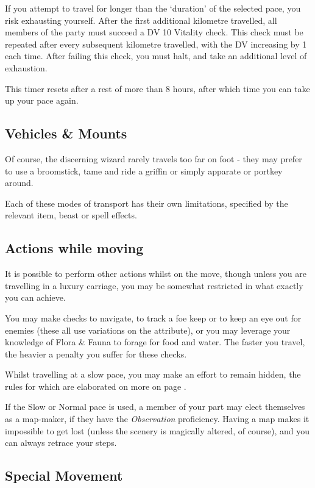 \normalsize
If you attempt to travel for longer than the `duration' of the selected pace, you risk exhausting yourself. After the first additional kilometre travelled, all members of the party must succeed a DV 10 Vitality check. This check must be repeated after every subsequent kilometre travelled, with the DV increasing by 1 each time. After failing this check, you must halt, and take an additional level of exhaustion. 

This timer resets after a rest of more than 8 hours, after which time you can take up your pace again. 

\subsection{Vehicles \& Mounts}

Of course, the discerning wizard rarely travels too far on foot - they may prefer to use a broomstick, tame and ride a griffin or simply apparate or portkey around. 

Each of these modes of transport has their own limitations, specified by the relevant item, beast or spell effects. 

\subsection{Actions while moving}

It is possible to perform other actions whilst on the move, though unless you are travelling in a luxury carriage, you may be somewhat restricted in what exactly you can achieve. 

You may make checks to navigate, to track a foe keep or to keep an eye out for enemies (these all use variations on the \attPer{} attribute), or you may leverage your knowledge of Flora \& Fauna to forage for food and water. The faster you travel, the heavier a penalty you suffer for these checks. 

Whilst travelling at a slow pace, you may make an effort to remain hidden, the rules for which are elaborated on more on page \pageref{S:Stealth}. 

If the Slow or Normal pace is used, a member of your part may elect themselves as a map-maker, if they have the {\it Observation} proficiency. Having a map makes it impossible to get lost (unless the scenery is magically altered, of course), and you can always retrace your steps. 

\subsection{Special Movement}\label{S:SpecialMovement}

